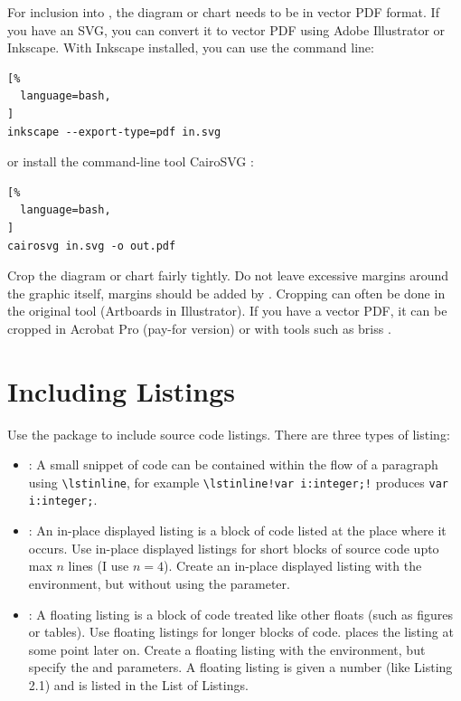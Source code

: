 For inclusion into \LaTeXe, the diagram or chart needs to be in vector
PDF format. If you have an SVG, you can convert it to vector PDF using
Adobe Illustrator or Inkscape. With Inkscape installed, you can use
the command line:
\begin{lstlisting}[%
  language=bash,
]
inkscape --export-type=pdf in.svg
\end{lstlisting}
or install the command-line tool CairoSVG \parencite{CairoSVG}:
\begin{lstlisting}[%
  language=bash,
]
cairosvg in.svg -o out.pdf
\end{lstlisting}


Crop the diagram or chart fairly tightly. Do not leave excessive
margins around the graphic itself, margins should be added by \LaTeXe.
Cropping can often be done in the original tool (Artboards in
Illustrator). If you have a vector PDF, it can be cropped in Acrobat
Pro (pay-for version) \parencite{Adobe-AcrobatPro} or with tools such
as briss \parencite{briss}.






\section{Including Listings}

Use the  package to include source code listings.
There are three types of listing:
\begin{itemize}
\item {}: A small snippet of code can be contained
  within the flow of a paragraph using \lstinline!\lstinline!, for
  example \lstinline|\lstinline!var i:integer;!| produces
  \lstinline!var i:integer;!.

\item {}: An in-place displayed listing is a
  block of code listed at the place where it occurs. Use in-place
  displayed listings for short blocks of source code upto max $n$
  lines (I use $n=4$). Create an in-place displayed listing with the
   environment, but without using the 
  parameter.

\item {}: A floating listing is a block of code
  treated like other \LaTeXe floats (such as figures or tables). Use
  floating listings for longer blocks of code. \LaTeXe places the
  listing at some point later on. Create a floating listing with the
   environment, but specify the  and
   parameters. A floating listing is given a number
  (like Listing 2.1) and is listed in the List of Listings.

\end{itemize}

